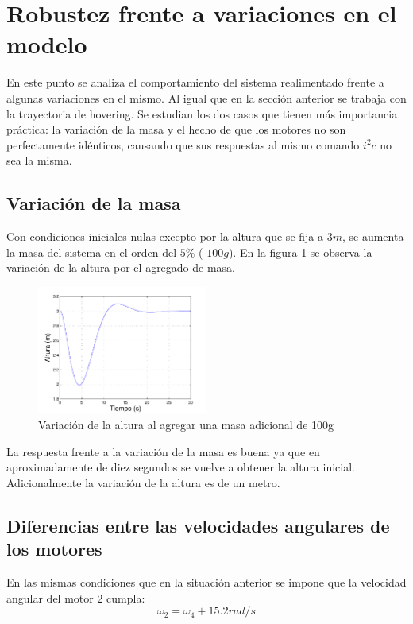 \documentclass[main]{subfiles}
\begin{document}
\section{Robustez frente a variaciones en el modelo}
\label{sec:robustez}

En este punto se analiza el comportamiento del sistema realimentado frente a algunas variaciones en el mismo. Al igual que en la secci\'on anterior se trabaja con la trayectoria de hovering. Se estudian los dos casos que tienen m\'as importancia pr\'actica: la variaci\'on de la masa y el hecho de que los motores no son perfectamente id\'enticos, causando que sus respuestas al mismo comando $i^2c$ no sea la misma.
\subsection*{Variaci\'on de la masa}
Con condiciones iniciales nulas excepto por la altura que se fija a $3m$, se aumenta la masa del sistema en el orden del $5\%$ ( $100 g$). En la figura \ref{fig:masa} se observa la variaci\'on de la altura por el agregado de masa.


\begin{figure}[h!]
  \centering
	\includegraphics[width=0.5\textwidth]{./pics_sim_control/robustez/masa.pdf}
  \caption{Variaci\'on de la altura al agregar una masa adicional de 100g}
  \label{fig:masa}
\end{figure}

La respuesta frente a la variaci\'on de la masa es buena ya que en aproximadamente de diez segundos se vuelve a obtener la altura inicial. Adicionalmente la variaci\'on de la altura es de un metro. 

\subsection*{Diferencias entre las velocidades angulares de los motores}

En las mismas condiciones que en la situaci\'on anterior se impone que la velocidad angular del motor 2 cumpla: 
\begin{equation}
\omega_2 = \omega_4 + 15.2rad/s
\end{equation}
\end{document}

